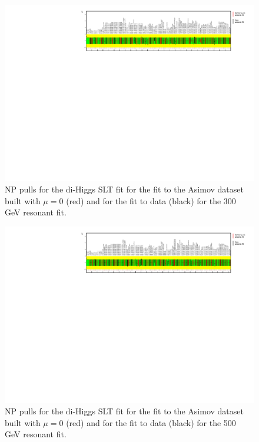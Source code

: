 \begin{figure}
\centering
\includegraphics[angle=270]{figures/results/HH/LepHad/NP_allExceptGammas_2HDM300_SLT.pdf}
\caption{NP pulls for the di-Higgs \lephad SLT fit for the fit to the Asimov dataset built with $\mu=0$ (red) and for the fit to data (black) for the 300 GeV resonant fit.}
\label{fig:LepHadPostfitNPPulls2HDM300SLT}
\end{figure}

\begin{figure}
\centering
\includegraphics[angle=270]{figures/results/HH/LepHad/NP_allExceptGammas_2HDM500_SLT.pdf}
\caption{NP pulls for the di-Higgs \lephad SLT fit for the fit to the Asimov dataset built with $\mu=0$ (red) and for the fit to data (black) for the 500 GeV  resonant fit.}
\label{fig:LepHadPostfitNPPulls2HDM500SLT}
\end{figure}


